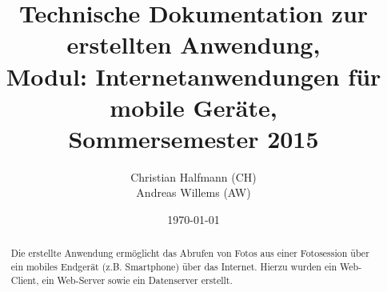\documentclass[a4paper]{scrartcl}
\title{Technische Dokumentation zur erstellten Anwendung,\\
	Modul: Internetanwendungen für mobile Geräte,\\Sommersemester 2015}
\author{Christian Halfmann (CH)\\Andreas Willems (AW)}
\date{\today}
\begin{document}
\maketitle

\begin{abstract}
Die erstellte Anwendung ermöglicht das Abrufen von Fotos aus einer Fotosession über ein mobiles Endgerät (z.B. Smartphone) über das Internet. Hierzu wurden ein Web-Client, ein Web-Server sowie ein Datenserver erstellt.
\end{abstract}
\tableofcontents
\newpage






\end{document}
